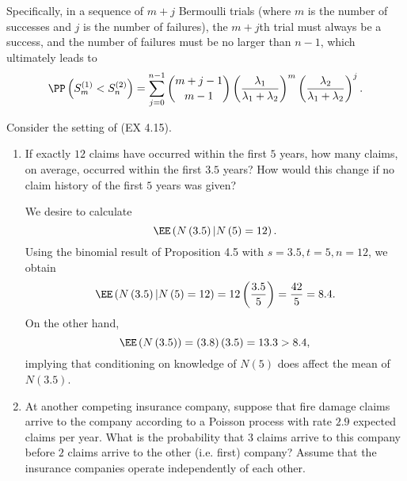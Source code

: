 \documentclass[stat333]{subfiles}
\begin{document}
    Specifically, in a sequence of $m+j$ Bermoulli trials (where $m$ is the number of successes and $j$ is the number of failures), the $m+j$th trial must always be a success, and the number of failures must be no larger than $n-1$, which ultimately leads to
    \begin{equation*}
        \PP\left( S_m^{\left( 1 \right)}<S_n^{\left( 2 \right)} \right) = \sum^{n-1}_{j=0} \binom{m+j-1}{m-1} \left( \frac{\lambda_1}{\lambda_1+\lambda_2} \right)^m\left( \frac{\lambda_2}{\lambda_1+\lambda_2} \right)^j.
    \end{equation*}

    \ex Consider the setting of (EX 4.15).
    \begin{enumerate}
        \item If exactly $12$ claims have occurred within the first $5$ years, how many claims, on average, occurred within the first $3.5$ years? How would this change if no claim history of the first $5$ years was given?
            \begin{subproof}[Answer]
                We desire to calculate
                \begin{equation*}
                    \EE\left( N\left( 3.5 \right)|N\left( 5 \right)=12 \right).
                \end{equation*}
                Using the binomial result of Proposition 4.5 with $s=3.5, t=5, n=12$, we obtain
                \begin{equation*}
                    \EE\left( N\left( 3.5 \right)|N\left( 5 \right)=12 \right) = 12\left( \frac{3.5}{5} \right) = \frac{42}{5} = 8.4.
                \end{equation*}
                On the other hand,
                \begin{equation*}
                    \EE\left( N\left( 3.5 \right) \right) = \left( 3.8 \right)\left( 3.5 \right) = 13.3 > 8.4,
                \end{equation*}
                implying that conditioning on knowledge of $N\left( 5 \right)$ does affect the mean of $N\left( 3.5 \right)$.
            \end{subproof}

        \item At another competing insurance company, suppose that fire damage claims arrive to the company according to a Poisson process with rate $2.9$ expected claims per year. What is the probability that $3$ claims arrive to this company before $2$ claims arrive to the other (i.e. first) company? Assume that the insurance companies operate independently of each other.


\end{enumerate}
\end{document}
